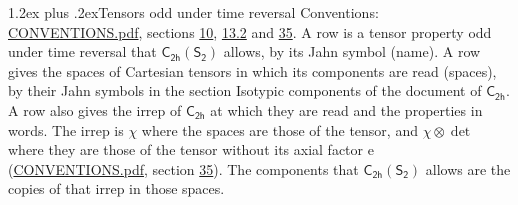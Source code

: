 \documentclass[10pt,a4paper]{article}
\makeatletter
\renewcommand\section{\@startsection{section}{1}{\z@}{-3ex plus -1ex minus -.2ex}%
  {1.2ex plus .2ex}{\normalfont\large\sffamily\bfseries\color{parttitle}}}
\numberwithin{equation}{section}
\newcommand{\grp}[1]{\mathsf{#1}}
\newcommand{\irrprod}{\otimes}
\makeatother
\begin{document}
\section{Tensors odd under time reversal}\label{s:time_odd}
Conventions: \href{../../CONVENTIONS.pdf}{CONVENTIONS.pdf}, sections \href{../../../rotation/CONVENTIONS.pdf\#conv.10}{10}, \href{../../../rotation/CONVENTIONS.pdf\#conv.13.2}{13.2} and \href{../../CONVENTIONS.pdf\#conv.35}{35}.
\leavevmode\label{n:head.name.property}A row is a tensor property odd under time reversal that $\grp{C_{2h}}(\grp{S_{2}})$ allows, by its Jahn symbol (name). \label{n:head.spaces}A row gives the spaces of Cartesian tensors in which its components are read (spaces), by their Jahn symbols in the section Isotypic components of the document of \href{../../../rotation/data/pdf/C2h.pdf}{$\grp{C_{2h}}$}. \label{n:head.properties}A row also gives the irrep of $\grp{C_{2h}}$ at which they are read and the properties in words. The irrep is $\chi$ where the spaces are those of the tensor, and $\chi \irrprod \det$ where they are those of the tensor without its axial factor e (\href{../../CONVENTIONS.pdf}{CONVENTIONS.pdf}, section \href{../../CONVENTIONS.pdf\#conv.35}{35}). The components that $\grp{C_{2h}}(\grp{S_{2}})$ allows are the copies of that irrep in those spaces.
\end{document}
